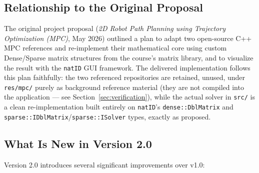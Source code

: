 ﻿\documentclass[11pt,a4paper]{article}
\begin{document}
\subsection{Relationship to the Original Proposal}
The original project proposal (\emph{2D Robot Path Planning using Trajectory Optimization (MPC)}, May 2026) outlined a plan to adapt two open-source C++ MPC references and re-implement their mathematical core using custom Dense/Sparse matrix structures from the course's matrix library, and to visualize the result with the \texttt{natID} GUI framework. The delivered implementation follows this plan faithfully: the two referenced repositories are retained, unused, under \texttt{res/mpc/} purely as background reference material (they are not compiled into the application --- see Section~\ref{sec:verification}), while the actual solver in \texttt{src/} is a clean re-implementation built entirely on \texttt{natID}'s \texttt{dense::DblMatrix} and \texttt{sparse::IDblMatrix}/\texttt{sparse::ISolver} types, exactly as proposed.

\subsection{What Is New in Version 2.0}
Version 2.0 introduces several significant improvements over v1.0:
\end{document}
